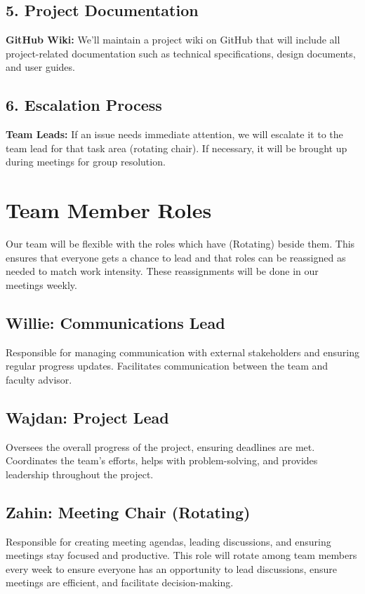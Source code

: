 \documentclass{article}
\begin{document}
\subsection*{5. Project Documentation}
\textbf{GitHub Wiki:} We’ll maintain a project wiki on GitHub that will include all project-related documentation such as technical specifications, design documents, and user guides.

\subsection*{6. Escalation Process}
\textbf{Team Leads:} If an issue needs immediate attention, we will escalate it to the team lead for that task area (rotating chair). If necessary, it will be brought up during meetings for group resolution.

\section{Team Member Roles}

Our team will be flexible with the roles which have (Rotating) beside them. This ensures that everyone gets a chance to lead and that roles can be reassigned as needed to match work intensity. These reassignments will be done in our meetings weekly.

\subsection*{Willie: Communications Lead}
Responsible for managing communication with external stakeholders and ensuring regular progress updates. Facilitates communication between the team and faculty advisor.

\subsection*{Wajdan: Project Lead}
Oversees the overall progress of the project, ensuring deadlines are met. Coordinates the team's efforts, helps with problem-solving, and provides leadership throughout the project.

\subsection*{Zahin: Meeting Chair (Rotating)}
Responsible for creating meeting agendas, leading discussions, and ensuring
meetings stay focused and productive. This role will rotate among team members every week to ensure everyone has an opportunity to lead discussions, ensure meetings are efficient, and facilitate decision-making.
\end{document}

